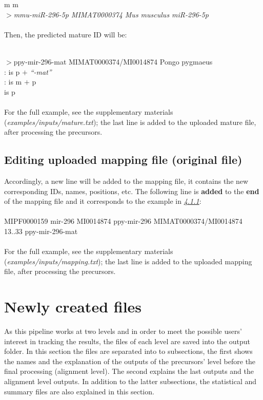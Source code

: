 \documentclass[a4paper,20pt]{report}
\newcommand*{\rom}[1]{\uppercase\expandafter{\romannumeral #1\relax}}
\begin{document}
\rom{1}m \hspace{2.2 cm}\rom{2}m\\
\textit{$>$mmu-miR-296-5p MIMAT0000374 Mus musculus miR-296-5p}\\\\
Then, the predicted mature ID will be:

 \rom{1} \hspace{2.4 cm}\rom{2} \hspace{4.1cm}\rom{3}\\
$>$ppy-mir-296-mat MIMAT0000374/MI0014874 Pongo pygmaeus\\
\rom{1}: is \rom{1}p \small $+$ \normalsize \textit{``-mat''}\\
\rom{2}: is \rom{2}m \small $+$ \normalsize \rom{2}p\\
\normalsize \rom{3} is \rom{3}p\\\\
\normalsize
For the full example, see the supplementary materials (\textit{examples/inputs/mature.txt}); the last line is added to the
uploaded mature file, after processing the precursors.

\subsection{Editing uploaded mapping file (original file)}
\noindent
\normalsize
Accordingly, a new line will be added to the mapping file, it contains the new corresponding IDs, names, positions, etc.
The following line is \textbf{added} to the \textbf{end} of the mapping file and it corresponds to the example in \hyperref[subsec:editmat]{\textit{4.1.1}}:\\\\
MIPF0000159 mir-296 MI0014874 ppy-mir-296 MIMAT0000374/MI0014874 13..33 ppy-mir-296-mat\\\\
For the full example, see the supplementary materials (\textit{examples/inputs/mapping.txt}); the last line is added to the
uploaded mapping file, after processing the precursors.

\section{Newly created files}
As this pipeline works at two levels and in order to meet the possible users' interest in tracking 
the results, the files of each level are saved into the output folder. In this section the files are 
separated into to subsections, the first shows the names and the explanation of the outputs of 
the precursors' level before the final processing (alignment level). The second explains the last 
outputs and the alignment level outputs. In addition to the latter subsections, the statistical and 
summary files are also explained in this section.
\end{document}
